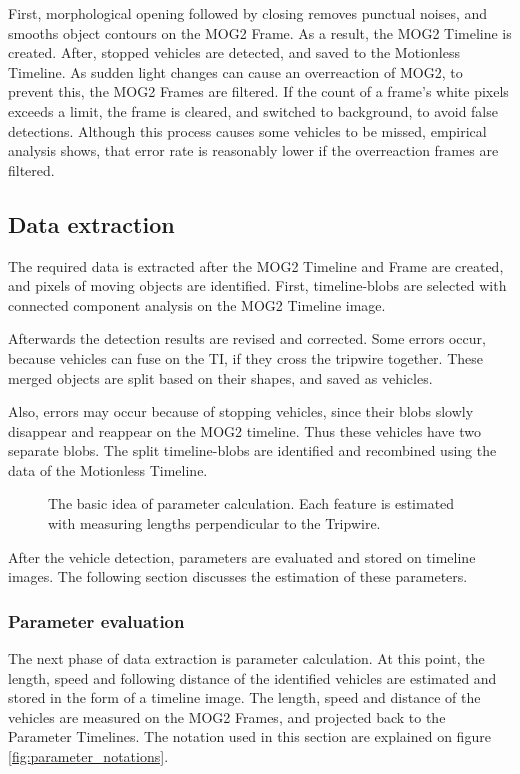 First, morphological opening followed by closing removes punctual noises, and smooths object contours on the MOG2 Frame.
As a result, the MOG2 Timeline is created.
After, stopped vehicles are detected, and saved to the Motionless Timeline.
As sudden light changes can cause an overreaction of MOG2, to prevent this, the MOG2 Frames are filtered.
If the count of a frame's white pixels exceeds a limit, the frame is cleared, and switched to background, to avoid false detections.
Although this process causes some vehicles to be missed, empirical analysis shows, that error rate is reasonably lower if the overreaction frames are filtered.
\subsection{Data extraction}
The required data is extracted after the MOG2 Timeline and Frame are created, and pixels of moving objects are identified.
First, timeline-blobs are selected with connected component analysis on the MOG2 Timeline image.

Afterwards the detection results are revised and corrected.
Some errors occur, because vehicles can fuse on the TI, if they cross the tripwire together. These merged objects are split based on their shapes, and saved as vehicles.

Also, errors may occur because of stopping vehicles, since their blobs slowly disappear and reappear on the MOG2 timeline.
Thus these vehicles have two separate blobs.
The split timeline-blobs are identified and recombined using the data of the Motionless Timeline. 

\begin{figure}[p]
	\centering
	
	\caption{The basic idea of parameter calculation. Each feature is estimated with measuring lengths perpendicular to the Tripwire.\label{fig:size_speed_following_distance}}
\end{figure}

After the vehicle detection, parameters are evaluated and stored on timeline images.
The following section discusses the estimation of these parameters.

\subsubsection{Parameter evaluation}\label{chap:parameter_evaluation}
The next phase of data extraction is parameter calculation.
At this point, the length, speed and following distance of the identified vehicles are estimated and stored in the form of a timeline image.
The length, speed and distance of the vehicles are measured on the MOG2 Frames, and projected back to the Parameter Timelines.
The notation used in this section are explained on figure \ref{fig:parameter_notations}.

